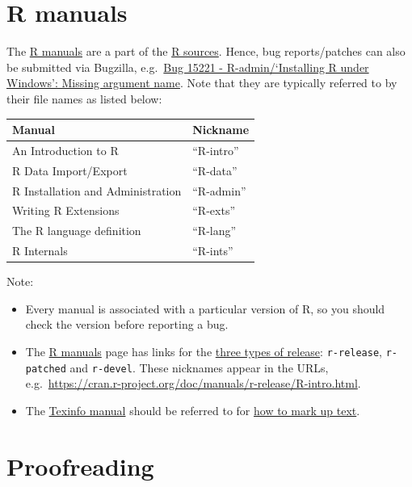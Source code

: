 \documentclass[
]{book}
\providecommand{\tightlist}{%
  \setlength{\itemsep}{0pt}\setlength{\parskip}{0pt}}
\begin{document}
\section{R manuals}\label{r-manuals}

The \href{https://cran.r-project.org/manuals.html}{R manuals} are a part of the \href{https://svn.r-project.org/R/trunk/doc/manual/}{R sources}. Hence, bug reports/patches can also be submitted via Bugzilla, e.g.~\href{https://bugs.r-project.org/bugzilla/show_bug.cgi?id=15221}{Bug 15221 - R-admin/`Installing R under Windows': Missing argument name}. Note that they are typically referred to by their file names as listed below:

\begin{longtable}[]{@{}ll@{}}
\toprule\noalign{}
Manual & Nickname \\
\midrule\noalign{}
\endhead
\bottomrule\noalign{}
\endlastfoot
An Introduction to R & ``R-intro'' \\
R Data Import/Export & ``R-data'' \\
R Installation and Administration & ``R-admin'' \\
Writing R Extensions & ``R-exts'' \\
The R language definition & ``R-lang'' \\
R Internals & ``R-ints'' \\
\end{longtable}

Note:

\begin{itemize}
\tightlist
\item
  Every manual is associated with a particular version of R, so you should check the version before reporting a bug.
\item
  The \href{https://cran.r-project.org/manuals.html}{R manuals} page has links for the \href{https://contributor.r-project.org/rdevguide/GetStart.html\#the-r-source-code}{three types of release}: \texttt{r-release}, \texttt{r-patched} and \texttt{r-devel}. These nicknames appear in the URLs, e.g.~\url{https://cran.r-project.org/doc/manuals/r-release/R-intro.html}.
\item
  The \href{https://www.gnu.org/software/texinfo/}{Texinfo manual} should be referred to for \href{https://www.gnu.org/software/texinfo/manual/texinfo/texinfo.html}{how to mark up text}.
\end{itemize}

\section{Proofreading}\label{proofreading}
\end{document}
